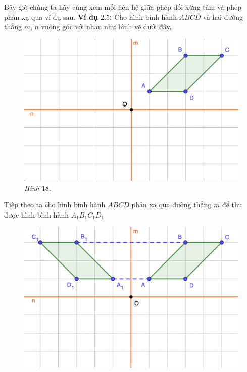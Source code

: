 \begin{multicols}{2}
	\vskip 0.1cm
	Bây giờ chúng ta hãy cùng xem mối liên hệ giữa phép đối xứng tâm và phép phản xạ qua ví dụ sau.
	\vskip 0.1cm
	\textbf{\color{toancuabi}Ví dụ $\pmb{2.5}$:} Cho hình bình hành $ABCD$ và hai đường thẳng $m$, $n$ vuông góc với nhau như hình vẽ dưới đây.
	\begin{figure}[H]
		\vspace*{-5pt}
		\centering
		\captionsetup{labelformat= empty, justification=centering}
		\includegraphics[width= 1\linewidth]{17}
		\caption{\small\textit{\color{toancuabi}Hình $18$.}}
		\vspace*{-5pt}
	\end{figure}
	Tiếp theo ta cho hình bình hành $ABCD$ phản xạ qua đường thẳng $m$ để thu được hình bình hành $A_1B_1C_1D_1$
	\begin{figure}[H]
		\vspace*{-5pt}
		\centering
		\captionsetup{labelformat= empty, justification=centering}
		\includegraphics[width= 1\linewidth]{18}

\end{figure}
\end{multicols}
